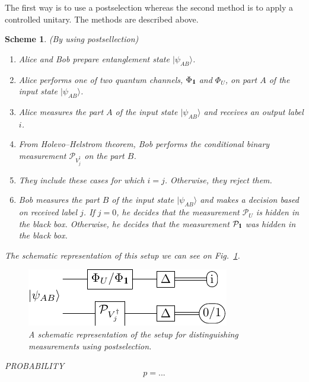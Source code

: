 \documentclass[preprint,12pt, a4paper]{elsarticle}
\newcommand{\ket}[1]{\ensuremath{|#1\rangle}}
\newcommand{\1}{{\rm 1\hspace{-0.9mm}l}}
\newcommand{\Id}{{\rm 1\hspace{-0.9mm}l}}
\newcommand{\PP}{\mathcal{P}}
\newtheorem{scheme}{Scheme}
\begin{document}
The first way is to use a postselection whereas the second method is to apply a controlled unitary. The methods are described above. 

\begin{scheme}(By using postsellection)








\begin{enumerate}
	\item Alice and Bob prepare entanglement state $\ket{\psi_{AB}}$.
	\item Alice performs one of two quantum channels, $\Phi_{\Id}$ and $\Phi_{U}$,  on part $A$ of the input 
	state  $\ket{\psi_{AB}}$.
	\item Alice measures the part $A$ of the input state  $\ket{\psi_{AB}}$ and receives an output label $i$.
	\item  
	From Holevo--Helstrom theorem, 
	 Bob performs the conditional binary measurement $\PP_{V_j^\dagger}$ on the part 	$B$.
	\item They include these cases for which $i = j$. Otherwise, they reject them.
	\item
	Bob measures the part $B$ of the input state  $\ket{\psi_{AB}}$ and 
	makes a decision based on received label $j$. If $j=0$, he decides that the measurement $\PP_U$ is hidden in the black box. Otherwise, he decides that the measurement $\PP_{\Id}$ was hidden in the black box. 
\end{enumerate}


The schematic representation of this setup we can see on Fig.~\ref{fig:postsellection}.     

\begin{figure}[h!]
	\centering 
	\includegraphics[scale=1.7]{pics/postselection} 
	
	\caption{ A schematic representation of the setup for distinguishing
		measurements using postselection. 
	}\label{fig:postsellection}
\end{figure}  


PROBABILITY 
		\begin{equation}
		p = ...
		\end{equation}

\end{scheme}
\end{document}
